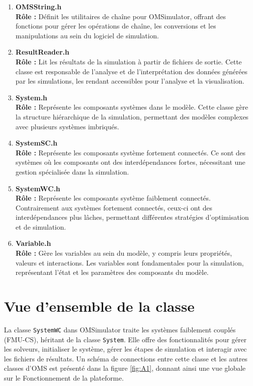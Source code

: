 \begin{enumerate}
    \item \textbf{OMSString.h} \\
    \textbf{Rôle :} Définit les utilitaires de chaîne pour OMSimulator, offrant des fonctions pour gérer les opérations de chaîne, les conversions et les manipulations au sein du logiciel de simulation.

    \item \textbf{ResultReader.h} \\
    \textbf{Rôle :} Lit les résultats de la simulation à partir de fichiers de sortie. Cette classe est responsable de l'analyse et de l'interprétation des données générées par les simulations, les rendant accessibles pour l'analyse et la visualisation.

    \item \textbf{System.h} \\
    \textbf{Rôle :} Représente les composants systèmes dans le modèle. Cette classe gère la structure hiérarchique de la simulation, permettant des modèles complexes avec plusieurs systèmes imbriqués.

    \item \textbf{SystemSC.h} \\
    \textbf{Rôle :} Représente les composants système fortement connectés. Ce sont des systèmes où les composants ont des interdépendances fortes, nécessitant une gestion spécialisée dans la simulation.

    \item \textbf{SystemWC.h} \\
    \textbf{Rôle :} Représente les composants système faiblement connectés. Contrairement aux systèmes fortement connectés, ceux-ci ont des interdépendances plus lâches, permettant différentes stratégies d'optimisation et de simulation.

    \item \textbf{Variable.h} \\
    \textbf{Rôle :} Gère les variables au sein du modèle, y compris leurs propriétés, valeurs et interactions. Les variables sont fondamentales pour la simulation, représentant l'état et les paramètres des composants du modèle.
\end{enumerate}


\section{Vue d'ensemble de la classe} \label{sec:WC}

La classe \texttt{SystemWC} dans OMSimulator traite les systèmes faiblement couplés (FMU-CS), héritant de la classe \texttt{System}. Elle offre des fonctionnalités pour gérer les solveurs, initialiser le système, gérer les étapes de simulation et interagir avec les fichiers de résultats.
Un schéma de connections entre cette classe et les autres classes d'OMS est présenté dans la figure \ref{fig:A1}, donnant ainsi une vue globale sur le Fonctionnement de la plateforme.


